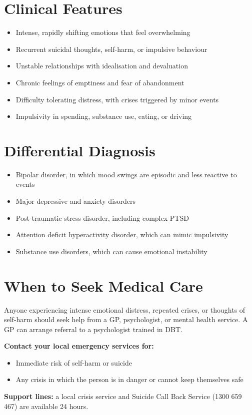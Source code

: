\section*{Clinical Features}
\begin{itemize}
    \item Intense, rapidly shifting emotions that feel overwhelming
    \item Recurrent suicidal thoughts, self-harm, or impulsive behaviour
    \item Unstable relationships with idealisation and devaluation
    \item Chronic feelings of emptiness and fear of abandonment
    \item Difficulty tolerating distress, with crises triggered by minor events
    \item Impulsivity in spending, substance use, eating, or driving
\end{itemize}

\section*{Differential Diagnosis}
\begin{itemize}
    \item Bipolar disorder, in which mood swings are episodic and less reactive to events
    \item Major depressive and anxiety disorders
    \item Post-traumatic stress disorder, including complex PTSD
    \item Attention deficit hyperactivity disorder, which can mimic impulsivity
    \item Substance use disorders, which can cause emotional instability
\end{itemize}

\section*{When to Seek Medical Care}
Anyone experiencing intense emotional distress, repeated crises, or thoughts of self-harm should seek help from a GP, psychologist, or mental health service. A GP can arrange referral to a psychologist trained in DBT.

\textbf{Contact your local emergency services for:}
\begin{itemize}
    \item Immediate risk of self-harm or suicide
    \item Any crisis in which the person is in danger or cannot keep themselves safe
\end{itemize}
\textbf{Support lines:} a local crisis service and Suicide Call Back Service (1300 659 467) are available 24 hours.

